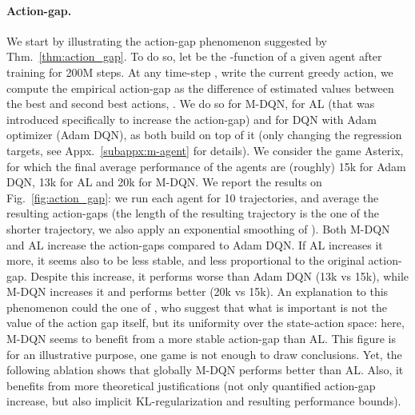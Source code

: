 \documentclass{article}
\begin{document}
\paragraph{Action-gap.}
We start by illustrating the action-gap phenomenon suggested by Thm.~\ref{thm:action_gap}. To do so, let  be the -function of a given agent after training for 200M steps. At any time-step , write  the current greedy action, we compute the empirical action-gap as the difference of estimated values between the best and second best actions, . We do so for M-DQN, for AL (that was introduced specifically to increase the action-gap) and for DQN with Adam optimizer (Adam DQN), as both build on top of it (only changing the regression targets, see Appx.~\ref{subappx:m-agent} for details). We consider the game Asterix, for which the final average performance of the agents are (roughly) 15k for Adam DQN, 13k for AL and 20k for M-DQN.
We report the results on Fig.~\ref{fig:action_gap}: we run each agent for 10 trajectories, and average the resulting action-gaps (the length of the resulting trajectory is the one of the shorter trajectory, we also apply an exponential smoothing of ).
Both M-DQN and AL increase the action-gaps compared to Adam DQN. If AL increases it more, it seems also to be less stable, and less proportional to the original action-gap. Despite this increase, it performs worse than Adam DQN (13k vs 15k), while M-DQN increases it and performs better (20k vs 15k). An explanation to this phenomenon could the one of \citet{van2019using}, who suggest that what is important is not the value of the action gap itself, but its uniformity over the state-action space: here, M-DQN seems to benefit from a more stable action-gap than AL.
This figure is for an illustrative purpose, one game is not enough to draw conclusions. Yet, the following ablation shows that globally M-DQN performs better than AL. Also, it benefits from more theoretical justifications (not only quantified action-gap increase, but also implicit KL-regularization and resulting performance bounds).
\end{document}
